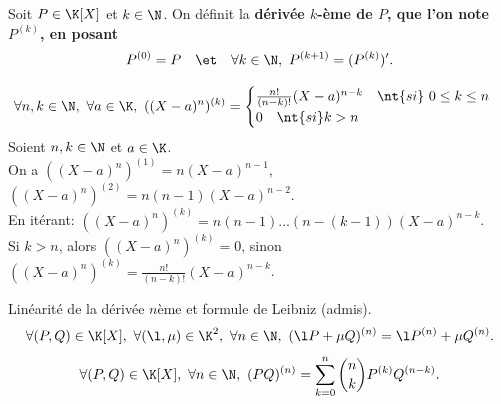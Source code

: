 \documentclass[11pt]{article}
\begin{document}
\vspace*{-0.4cm}

\begin{defi}{}{}
    Soit $P\in\K[X]$ et $k\in\N$. On définit la \bf{dérivée $k$-ème} de $P$, que l'on note $P^{(k)}$, en posant
    \begin{equation*}
        P^{(0)}=P \quad \et \quad \forall k \in \N, ~ P^{(k+1)}=(P^{(k)})'.
    \end{equation*}
\end{defi}

\vspace*{-0.4cm}

\begin{ex}{}{}
    \begin{equation*}
        \forall n,k \in \N, ~ \forall a \in \K, ~ ((X-a)^n)^{(k)} = \begin{cases}\frac{n!}{(n-k)!}(X-a)^{n-k} \quad \nt{si} ~ 0 \leq k \leq n\\ 0 \quad \nt{si } k > n\end{cases}
    \end{equation*}
    \tcblower
    Soient $n,k\in\N$ et $a\in\K$.\\
    On a $((X-a)^n)^{(1)}=n(X-a)^{n-1}$, $((X-a)^n)^{(2)}=n(n-1)(X-a)^{n-2}$.\\
    En itérant: $((X-a)^n)^{(k)}=n(n-1)...(n-(k-1))(X-a)^{n-k}$.\\
    Si $k>n$, alors $((X-a)^n)^{(k)}=0$, sinon $((X-a)^n)^{(k)}=\frac{n!}{(n-k)!}(X-a)^{n-k}$.
\end{ex}

\vspace*{-0.4cm}

\begin{prop}{Linéarité de la dérivée $n$ème et formule de Leibniz (admis).}{}
    \begin{equation*}
        \forall (P,Q)\in\K[X], ~ \forall (\l,\mu)\in\K^2, ~ \forall n \in \N, ~ (\l P + \mu Q)^{(n)} = \l P^{(n)} + \mu Q^{(n)}.
    \end{equation*}
    \begin{equation*}
        \forall (P,Q)\in\K[X], ~ \forall n \in \N, ~ (PQ)^{(n)} = \sum_{k=0}^n\binom{n}{k}P^{(k)}Q^{(n-k)}.
    \end{equation*}
\end{prop}

\vspace*{-0.4cm}
\end{document}
